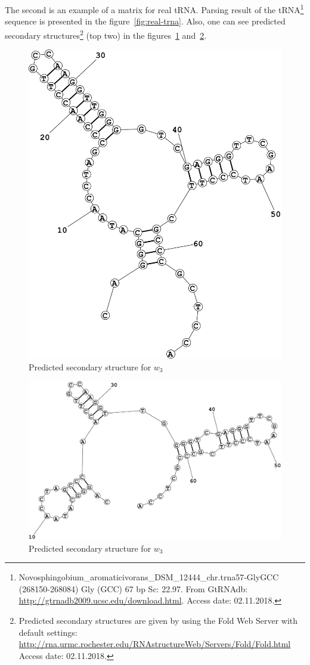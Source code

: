 \documentclass[a4paper,twoside]{article}
\begin{document}
The second is an example of a matrix for real tRNA.
Parsing result of the tRNA\footnote{Novosphingobium\_aromaticivorans\_DSM\_12444\_chr.trna57-GlyGCC (268150-268084)  Gly (GCC) 67 bp Sc: 22.97. From GtRNAdb: \url{http://gtrnadb2009.ucsc.edu/download.html}. Access date: 02.11.2018.} sequence {} is presented in the figure~\ref{fig:real-trna}. Also, one can see predicted secondary structures\footnote{Predicted secondary structures are given by using the Fold Web Server with default settings: \url{http://rna.urmc.rochester.edu/RNAstructureWeb/Servers/Fold/Fold.html} Access date: 02.11.2018.} (top two) in the figures~\ref{fig:real-trna-folding1} and~\ref{fig:real-trna-folding2}.

\begin{figure}
\centering
\includegraphics[width=.45\textwidth]{figures/Fold1.pdf}
\caption{Predicted secondary structure for $w_3$}
\label{fig:real-trna-folding1}
\end{figure}


\begin{figure}
\centering
\includegraphics[width=.45\textwidth]{figures/Fold2.pdf}
\caption{Predicted secondary structure for $w_3$}
\label{fig:real-trna-folding2}
\end{figure}
\end{document}
